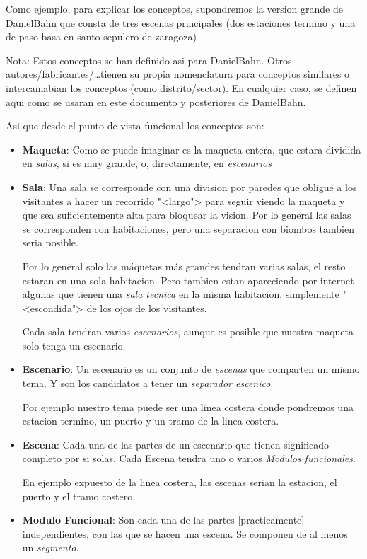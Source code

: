 Como ejemplo, para explicar los conceptos,  supondremos la version grande de DanielBahn que consta de tres escenas principales (dos estaciones termino y una de paso basa en santo sepulcro de zaragoza)

Nota: Estos conceptos se han definido asi para DanielBahn. Otros autores/fabricantes/\dots tienen su propia nomenclatura para conceptos similares o intercamabian los conceptos (como distrito/sector). En cualquier caso, se definen aqui como se usaran en este documento y posteriores de DanielBahn.

Asi que desde el punto de vista funcional los conceptos son:

\begin{itemize}
\item \textbf{Maqueta}: Como se puede imaginar es la maqueta entera, que estara dividida en \textit{salas}, si es muy grande, o, directamente, en \textit{escenarios} 
\item \textbf{Sala}: Una sala se corresponde con una division por paredes que obligue a los visitantes a hacer un recorrido "<largo"> para seguir viendo la maqueta y que sea suficientemente alta para bloquear la vision. Por lo general las salas se corresponden con habitaciones, pero una separacion con biombos tambien seria posible.

Por lo general solo las máquetas más grandes tendran varias salas, el resto estaran en una sola habitacion. Pero tambien estan apareciendo por internet algunas que tienen una \textit{sala tecnica} en la misma habitacion, simplemente "<escondida"> de los ojos de los visitantes.

Cada sala tendran varios \textit{escenarios}, aunque es posible que nuestra maqueta solo tenga un escenario.
\item \textbf{Escenario}: Un escenario es un conjunto de \textit{escenas} que comparten un mismo tema. Y son los candidatos a tener un \textit{separador escenico}.

Por ejemplo nuestro tema puede ser una linea costera donde pondremos una estacion termino, un puerto y un tramo de la linea costera.
\item \textbf{Escena}: Cada una de las partes de un escenario que tienen significado completo por si solas. Cada Escena tendra uno o varios \textit{Modulos funcionales}.

En ejemplo expuesto de la linea costera, las escenas serian la estacion, el puerto y el tramo costero. 

\item \textbf{Modulo Funcional}: Son cada una de las partes [practicamente] independientes, con las que se hacen una escena. Se componen de al menos un \textit{segmento}.


\end{itemize}

